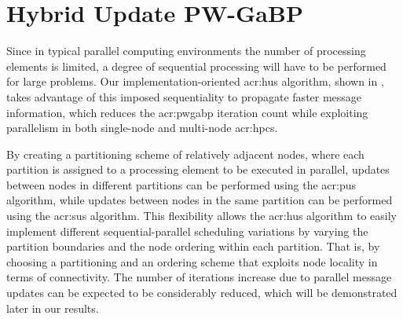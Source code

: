 \section{Hybrid Update PW-GaBP}
\label{sec:hus}

Since in typical parallel computing environments the number of processing elements is limited, a degree of sequential processing will have to be performed for large problems.
Our implementation-oriented \gls{acr:hus} algorithm, shown in , takes advantage of this imposed sequentiality to propagate faster message information, which reduces the \gls{acr:pwgabp} iteration count while exploiting parallelism in both single-node and multi-node \glspl{acr:hpc}.


By creating a partitioning scheme of relatively adjacent nodes, where each partition is assigned to a processing element to be executed in parallel, updates between nodes in different partitions can be performed using the \gls{acr:pus} algorithm, while updates between nodes in the same partition can be performed using the \gls{acr:sus} algorithm.
This flexibility allows the \gls{acr:hus} algorithm to easily implement different sequential-parallel scheduling variations by varying the partition boundaries and the node ordering within each partition.
That is, by choosing a partitioning and an ordering scheme that exploits node locality in terms of connectivity.
The number of iterations increase due to parallel message updates can be expected to be considerably reduced, which will be demonstrated later in our results.

